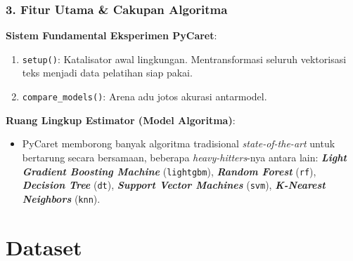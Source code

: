 \documentclass[t,aspectratio=169,xcolor=dvipsnames]{beamer}
\begin{document}
\begin{frame}
    \frametitle{3. Fitur Utama \& Cakupan Algoritma}
    \small
    \textbf{Sistem Fundamental Eksperimen PyCaret}:
    \begin{enumerate}
        \item \texttt{setup()}: Katalisator awal lingkungan. Mentransformasi seluruh vektorisasi teks menjadi data pelatihan siap pakai.
        \item \texttt{compare\_models()}: Arena adu jotos akurasi antarmodel.
    \end{enumerate}
    \vspace{0.2cm}
    \textbf{Ruang Lingkup Estimator (Model Algoritma)}:
    \begin{itemize}
        \item PyCaret memborong banyak algoritma tradisional \textit{state-of-the-art} untuk bertarung secara bersamaan, beberapa \textit{heavy-hitters}-nya antara lain: \textbf{\textit{Light Gradient Boosting Machine}} (\texttt{lightgbm}), \textbf{\textit{Random Forest}} (\texttt{rf}), \textbf{\textit{Decision Tree}} (\texttt{dt}), \textbf{\textit{Support Vector Machines}} (\texttt{svm}), \textbf{\textit{K-Nearest Neighbors}} (\texttt{knn}).
    \end{itemize}
\end{frame}

\section{Dataset}
\end{document}
